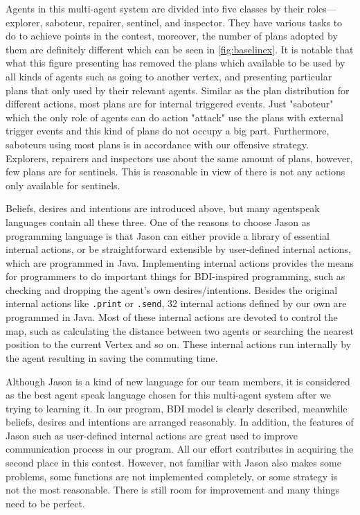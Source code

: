 Agents in this multi-agent system are divided into five classes by their roles---explorer, saboteur, repairer, sentinel, and inspector. They have various tasks to do to achieve points in the contest, moreover, the number of plans adopted by them are definitely different which can be seen in \autoref{fig:baselinex}.
It is notable that what this figure presenting has removed the plans which available to be used by all kinds of agents such as going to another vertex, and presenting particular plans that only used by their relevant agents.
Similar as the plan distribution for different actions, most plans are for internal triggered events. Just "saboteur" which the only role of agents can do action "attack" use the plans with external trigger events and this kind of plans do not occupy a big part. Furthermore, saboteurs using most plans is in accordance with our offensive strategy. Explorers, repairers and inspectors use about the same amount of plans, however, few plans are for sentinels. This is reasonable in view of there is not any actions only available for sentinels.

Beliefs, desires and intentions are introduced above, but many agentspeak languages contain all these three. One of the reasons to choose Jason as programming language is that Jason can either provide a library of essential internal actions, or be straightforward extensible by user-defined internal actions, which are programmed in Java\cite{rafael_Javabased_2007}. Implementing internal actions provides the means for programmers to do important things for BDI-inspired programming, such as checking and dropping the agent's own
desires/intentions\cite{rafael_overviewjason_2006}. Besides the original internal actions like \texttt{.print} or \texttt{.send}, 32 internal actions defined by our own are programmed in Java. Most of these internal actions are devoted to control the map, such as calculating the distance between two agents or searching the nearest position to the current Vertex and so on. These internal actions run internally by the agent resulting in saving the commuting time.

Although Jason is a kind of new language for our team members, it is considered as the best agent speak language chosen for this multi-agent system after we trying to learning it. In our program, BDI model is clearly described, meanwhile beliefs, desires and intentions are arranged reasonably. In addition, the features of Jason such as user-defined internal actions are great used to improve communication process in our program. All our effort contributes in acquiring the second place in this contest. However, not familiar with Jason also makes some problems, some functions are not implemented completely, or some strategy is not the most reasonable. There is still room for improvement and many things need to be perfect.
